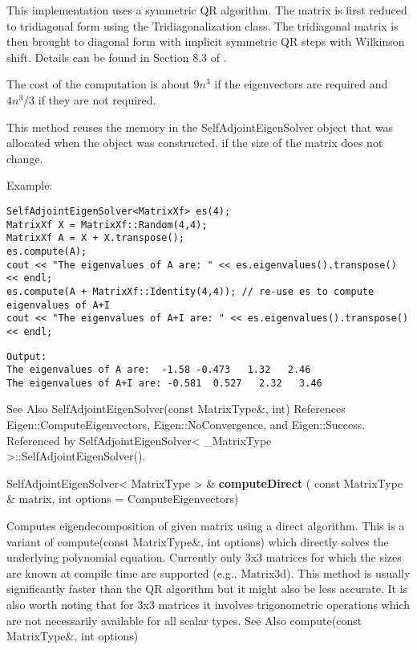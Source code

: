 This implementation uses a symmetric QR algorithm. The matrix is first reduced to tridiagonal form using the Tridiagonalization class. The tridiagonal matrix is then brought to diagonal form with implicit symmetric QR steps with Wilkinson shift. Details can be found in Section 8.3 of \cite{Golub1996}.

The cost of the computation is about $9n^3$ if the eigenvectors are required and $4n^3/3$ if they are not required.

This method reuses the memory in the SelfAdjointEigenSolver object that was allocated when the object was constructed, if the size of the matrix does not change.


Example:

\begin{lstlisting}
SelfAdjointEigenSolver<MatrixXf> es(4);
MatrixXf X = MatrixXf::Random(4,4);
MatrixXf A = X + X.transpose();
es.compute(A);
cout << "The eigenvalues of A are: " << es.eigenvalues().transpose() << endl;
es.compute(A + MatrixXf::Identity(4,4)); // re-use es to compute eigenvalues of A+I
cout << "The eigenvalues of A+I are: " << es.eigenvalues().transpose() << endl;
\end{lstlisting}

\begin{verbatim}
Output:
The eigenvalues of A are:  -1.58 -0.473   1.32   2.46
The eigenvalues of A+I are: -0.581  0.527   2.32   3.46
\end{verbatim}


See Also
SelfAdjointEigenSolver(const MatrixType\&, int) 
References Eigen::ComputeEigenvectors, Eigen::NoConvergence, and Eigen::Success.
Referenced by SelfAdjointEigenSolver< \_MatrixType >::SelfAdjointEigenSolver().



\vspace{0.3cm}
SelfAdjointEigenSolver< MatrixType > \& \textbf{computeDirect}  ( const MatrixType \&  matrix,   int  options = ComputeEigenvectors)   

Computes eigendecomposition of given matrix using a direct algorithm. 
This is a variant of compute(const MatrixType\&, int options) which directly solves the underlying polynomial equation.
Currently only 3x3 matrices for which the sizes are known at compile time are supported (e.g., Matrix3d).
This method is usually significantly faster than the QR algorithm but it might also be less accurate. It is also worth noting that for 3x3 matrices it involves trigonometric operations which are not necessarily available for all scalar types.
See Also
compute(const MatrixType\&, int options) 


